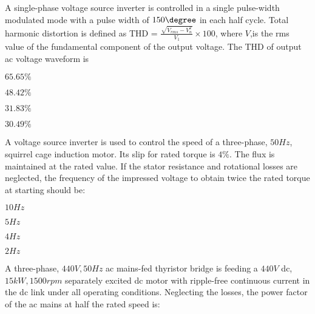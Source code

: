     \item A single-phase voltage source inverter is controlled in a single pulse-width modulated mode with a pulse width of $150\degree$ in each half cycle. Total harmonic distortion is defined as THD = $\frac{\sqrt{V_{rms}-V_n^2}}{V_1} \times 100$, where $V$,is the rms value of the fundamental component of the output voltage. The THD of output ac voltage waveform is
        \begin{enumerate}
                \begin{multicols}{2}
                \item $65.65\%$
                    \columnbreak
                \item $48.42\%$
                \end{multicols}
                \begin{multicols}{2}
                \item $31.83\%$
                    \columnbreak
                \item $30.49\%$
                \end{multicols}
        \end{enumerate}
    \item A voltage source inverter is used to control the speed of a three-phase, $50 Hz$, squirrel cage induction motor. Its slip for rated torque is $4\%$. The flux is maintained at the rated value. If the stator resistance and rotational losses are neglected, the frequency of the impressed voltage to obtain twice the rated torque at starting should be:
        \begin{enumerate}
                \begin{multicols}{2}
                \item $10 Hz$
                    \columnbreak
                \item $5 Hz$
                \end{multicols}
                \begin{multicols}{2}
                \item $4 Hz$
                    \columnbreak
                \item $2 Hz$
                \end{multicols}
        \end{enumerate}
    \item A three-phase, $440 V, 50 Hz$ ac mains-fed thyristor bridge is feeding a $440 V$ dc, $15 kW, 1500 rpm$ separately excited dc motor with ripple-free continuous current in the dc link under all operating conditions. Neglecting the losses, the power factor of the ac mains at half the rated speed is:
